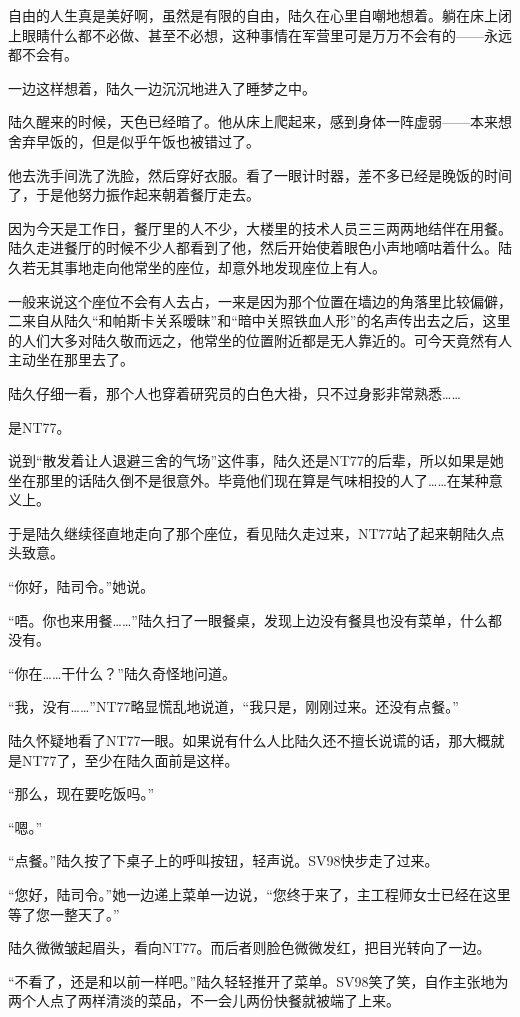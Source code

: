 自由的人生真是美好啊，虽然是有限的自由，陆久在心里自嘲地想着。躺在床上闭上眼睛什么都不必做、甚至不必想，这种事情在军营里可是万万不会有的——永远都不会有。

一边这样想着，陆久一边沉沉地进入了睡梦之中。

陆久醒来的时候，天色已经暗了。他从床上爬起来，感到身体一阵虚弱——本来想舍弃早饭的，但是似乎午饭也被错过了。

他去洗手间洗了洗脸，然后穿好衣服。看了一眼计时器，差不多已经是晚饭的时间了，于是他努力振作起来朝着餐厅走去。

因为今天是工作日，餐厅里的人不少，大楼里的技术人员三三两两地结伴在用餐。陆久走进餐厅的时候不少人都看到了他，然后开始使着眼色小声地嘀咕着什么。陆久若无其事地走向他常坐的座位，却意外地发现座位上有人。

一般来说这个座位不会有人去占，一来是因为那个位置在墙边的角落里比较偏僻，二来自从陆久“和帕斯卡关系暧昧”和“暗中关照铁血人形”的名声传出去之后，这里的人们大多对陆久敬而远之，他常坐的位置附近都是无人靠近的。可今天竟然有人主动坐在那里去了。

陆久仔细一看，那个人也穿着研究员的白色大褂，只不过身影非常熟悉……

是NT77。

说到“散发着让人退避三舍的气场”这件事，陆久还是NT77的后辈，所以如果是她坐在那里的话陆久倒不是很意外。毕竟他们现在算是气味相投的人了……在某种意义上。

于是陆久继续径直地走向了那个座位，看见陆久走过来，NT77站了起来朝陆久点头致意。

“你好，陆司令。”她说。

“唔。你也来用餐……”陆久扫了一眼餐桌，发现上边没有餐具也没有菜单，什么都没有。

“你在……干什么？”陆久奇怪地问道。

“我，没有……”NT77略显慌乱地说道，“我只是，刚刚过来。还没有点餐。”

陆久怀疑地看了NT77一眼。如果说有什么人比陆久还不擅长说谎的话，那大概就是NT77了，至少在陆久面前是这样。

“那么，现在要吃饭吗。”

“嗯。”

“点餐。”陆久按了下桌子上的呼叫按钮，轻声说。SV98快步走了过来。

“您好，陆司令。”她一边递上菜单一边说，“您终于来了，主工程师女士已经在这里等了您一整天了。”

陆久微微皱起眉头，看向NT77。而后者则脸色微微发红，把目光转向了一边。

“不看了，还是和以前一样吧。”陆久轻轻推开了菜单。SV98笑了笑，自作主张地为两个人点了两样清淡的菜品，不一会儿两份快餐就被端了上来。

